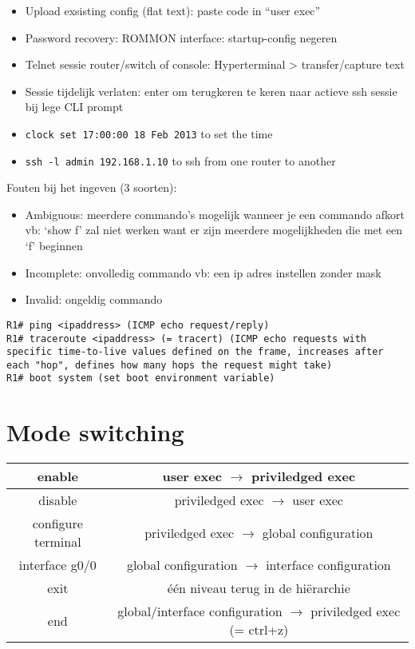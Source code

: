 \documentclass[10pt, a4paper]{article}
\begin{document}
	\begin{itemize}[noitemsep,nolistsep]
	\item Upload exsisting config (flat text): paste code in ``user exec''
	\item Password recovery: ROMMON interface: startup-config negeren
	\item Telnet sessie router/switch of console: Hyperterminal > transfer/capture text
	\item Sessie tijdelijk verlaten: enter om terugkeren te keren naar actieve ssh sessie bij lege CLI prompt
	\item \texttt{clock set 17:00:00 18 Feb 2013} to set the time
	\item \texttt{ssh -l admin 192.168.1.10} to ssh from one router to another\\
	\end{itemize}

Fouten bij het ingeven (3 soorten):
\begin{itemize}[noitemsep,nolistsep]
\item Ambiguous: meerdere commando's mogelijk wanneer je een commando afkort vb: `show f' zal niet werken want er zijn meerdere mogelijkheden die met een `f' beginnen
\item Incomplete: onvolledig commando vb: een ip adres instellen zonder mask
\item Invalid: ongeldig commando\\
\end{itemize}

\begin{lstlisting}
R1# ping <ipaddress> (ICMP echo request/reply)
R1# traceroute <ipaddress> (= tracert) (ICMP echo requests with specific time-to-live values defined on the frame, increases after each "hop", defines how many hops the request might take)
R1# boot system (set boot environment variable)
\end{lstlisting}

\section{Mode switching}
\begin{tabular}{|c|c|}
\hline \rule[-1ex]{0pt}{4ex} enable & user exec $\rightarrow$ priviledged exec  \\
\hline \rule[-1ex]{0pt}{4ex} disable  & priviledged exec $\rightarrow$ user exec \\
\hline \rule[-1ex]{0pt}{4ex} configure terminal & priviledged exec $\rightarrow$ global configuration \\
\hline \rule[-1ex]{0pt}{4ex} interface g0/0 & global configuration $\rightarrow$ interface configuration \\
\hline \rule[-1ex]{0pt}{4ex} exit & \'{e}\'{e}n niveau terug in de hi\"erarchie\\
\hline \rule[-1ex]{0pt}{4ex} end & global/interface configuration $\rightarrow$ priviledged exec (= ctrl+z)  \\
\hline
\end{tabular} \\
\end{document}
